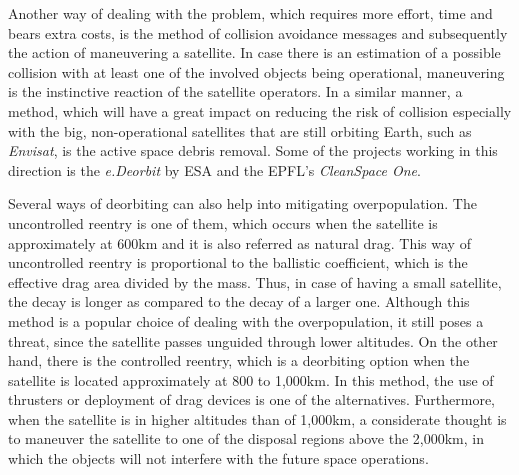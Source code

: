 Another way of dealing with the problem, which requires more effort, time and bears extra costs, is the method of collision avoidance messages and subsequently the action of maneuvering a satellite. In case there is an estimation of a possible collision with at least one of the involved objects being operational, maneuvering is the instinctive reaction of the satellite operators. In a similar manner, a method, which will have a great impact on reducing the risk of collision especially with the big, non-operational satellites that are still orbiting Earth, such as \textit{Envisat}, is the active space debris removal. Some of the projects working in this direction is the \textit{e.Deorbit} by ESA and the EPFL's \textit{CleanSpace One}.

Several ways of deorbiting can also help into mitigating overpopulation. The uncontrolled reentry is one of them, which occurs when the satellite is approximately at 600km and it is also referred as natural drag. This way of uncontrolled reentry is proportional to the ballistic coefficient, which is the effective drag area divided by the mass. Thus, in case of having a small satellite, the decay is longer as compared to the decay of a larger one. Although this method is a popular choice of dealing with the overpopulation, it still poses a threat, since the satellite passes unguided through lower altitudes. On the other hand, there is the controlled reentry, which is a deorbiting option when the satellite is located approximately at 800 to 1,000km. In this method, the use of thrusters or deployment of drag devices is one of the alternatives. Furthermore, when the satellite is in higher altitudes than of 1,000km, a considerate thought is to maneuver the satellite to one of the disposal regions above the 2,000km, in which the objects will not interfere with the future space operations. \cite{NASA}



